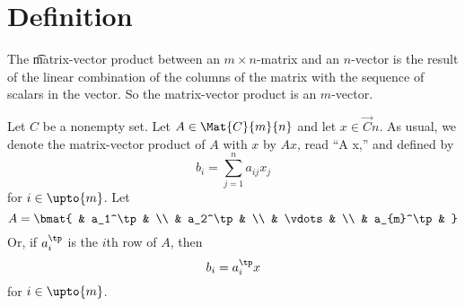 
\section*{Definition}

The \t{matrix-vector product} between an $m \times  n$-matrix and an $n$-vector is the result of the linear combination of the columns of the matrix with the sequence of scalars in the vector.
So the matrix-vector product is an $m$-vector.


Let $C$ be a nonempty set.
Let $A \in \Mat{C}{m}{n}$ and let $x \in \Vec{C}{n}$.
As usual, we denote the matrix-vector product of $A$ with $x$ by $Ax$, read ``A x,'' and defined by
\[
b_i = \sum_{j = 1}^{n} a_{ij}x_j
\]
for $i \in \upto{m}$.
Let
\[
A = \bmat{
& a_1^\tp & \\
& a_2^\tp & \\
& \vdots & \\
& a_{m}^\tp &
}
\]
Or, if $a_i^\tp$ is the $i$th row of $A$, then
\[
b_i = a_i^\tp x
\]
for $i \in \upto{m}$.

\blankpage
